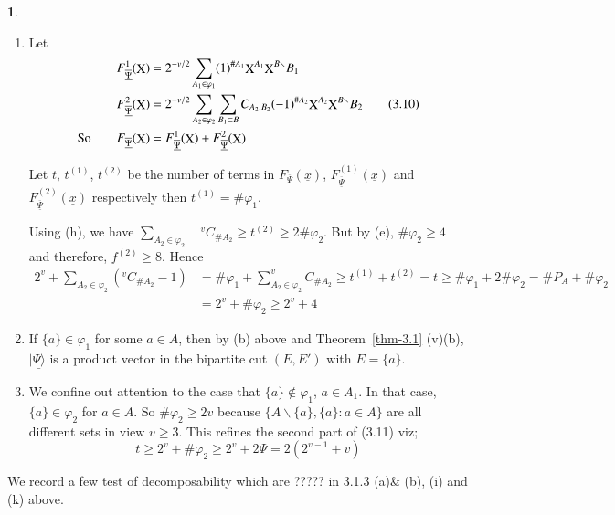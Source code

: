 \documentclass[a4paper,12pt]{article}
\DeclareMathOperator{\x}{\mathrm{X}}
\theoremstyle{definition}
\theoremstyle{underlinethm}
\theoremstyle{definition}
\newtheorem{subsubsec}{}[subsection]
\begin{document}
\begin{subsubsec}
\begin{enumerate}[label=(\alph*)]
\item Let 
\begin{align*}
F^{1}_{\underline{\overline{\Psi}}}(\bold{\x})  &= 2^{-v/2} \sum_{A_{1} \in \varphi_{1}}(1)^{\# A_{1}} \bold{\x}^{A_{1}} \bold{\x}^{B\smallsetminus} B_{1}\\
F^{2}_{\underline{\overline{\Psi}}}(\bold{\x})  &= 2^{-v/2} \sum_{A_{2} \in \varphi_{2}} \sum_{B_{1} \subset B} C_{A_{2}, B_{2}}(-1)^{\# A_{2}} \bold{\x}^{A_{2}} \bold{\x}^{B\smallsetminus}B_{2}\tag{3.10}\label{eq-3.10}\\
\text{So}\quad\quad F_{\underline{\overline{\Psi}}} (\bold{\x}) &= F^{1}_{\underline{\overline{\Psi}}} (\bold{\x}) + F^{2}_{\underline{\overline{\Psi}}} (\bold{\x})
\end{align*}

Let $t$, $t^{(1)}$, $t^{(2)}$ be the number of terms in $F_{\underline{\overline{\Psi}}}(\underline{x})$, $F^{(1)}_{\underline{\overline{\Psi}}}(\underline{x})$ and $F^{(2)}_{\underline{\overline{\Psi}}}(\underline{x})$ respectively then $t^{(1)} = \# \varphi_{1}$.

Using (h), we have $\sum_{A_{2} \in \varphi_{2}} \quad ^{v}C_{\# A_{2}} \geq t^{(2)} \geq 2 \# \varphi_{2}$. But by (e), $\# \varphi_{2} \geq 4$  and therefore, $f^{(2)} \geq 8$. Hence 
\begin{align*}
2^ {v} + \sum_{A_{2} \in \varphi_{2}}(^{v}C_{\# A_{2}}-1) &= \# \varphi_{1} + \sum_{A_{2} \in \varphi_{2}} ^{v}C_{\# A_{2}} \geq t^{(1)} + t^{(2)} = t \geq \# \varphi_{1} + 2 \# \varphi_{2} = \#P_{A} + \# \varphi_{2}\\
& = 2^{v} + \# \varphi_{2} \geq 2^{v} + 4 \tag{3.11}  
\end{align*}

\item If $\{a\} \in \varphi_{1}$ for some $a\in A$, then by (b) above and Theorem~\eqref{thm-3.1} (v)(b), $|\underline{\overline{\Psi} \rangle}$ is a product vector in the bipartite cut $(E, E')$ with $E= \{a\}$.

\item We confine out attention to the case that $\{a\} \notin \varphi_{1}$, $a\in A_{1}$. In that case, $\{a\} \in \varphi_{2}$ for $a\in A$. So $\# \varphi_{2} \geq 2v$ because $\{A \smallsetminus \{a\}, \{a\} : a \in A \}$ are all different sets in view $v \geq 3$. This refines the second part of (3.11) viz; 
\begin{equation*}
t \geq 2^{v} + \# \varphi_{2} \geq 2^{v} + 2 \Psi = 2(2^{v-1} + v)\tag{3.12} 
\end{equation*} 

\end{enumerate}

We record a few test of decomposability which are ????? in 3.1.3 (a)\& (b), (i) and (k) above.

\end{subsubsec}
\end{document}
